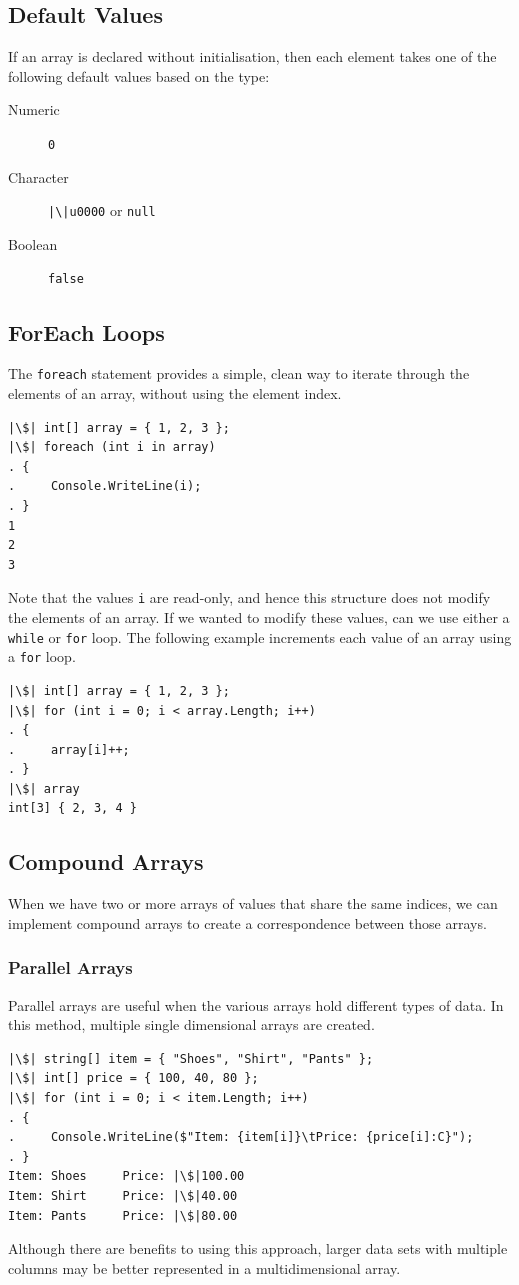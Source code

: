 \documentclass{article}
\begin{document}
\subsection{Default Values}
If an array is declared without initialisation, then each element takes
one of the following default values based on the type:
\begin{description}
    \item[Numeric] \texttt{0}
    \item[Character]
          \texttt{|\textbackslash|u0000}
          or \texttt{null}
    \item[Boolean] \texttt{false}
\end{description}
\subsection{ForEach Loops}
The \texttt{foreach} statement provides a simple, clean way
to iterate through the elements of an array, without using the element
index.
\begin{verbatim}
|\$| int[] array = { 1, 2, 3 };
|\$| foreach (int i in array)
. {
.     Console.WriteLine(i);
. }
1
2
3
\end{verbatim}
Note that the values \texttt{i} are read-only, and hence
this structure does not modify the elements of an array. If we wanted
to modify these values, can we use either a \texttt{while}
or \texttt{for} loop. The following example increments each
value of an array using a \texttt{for} loop.
\begin{verbatim}
|\$| int[] array = { 1, 2, 3 };
|\$| for (int i = 0; i < array.Length; i++)
. {
.     array[i]++;
. }
|\$| array
int[3] { 2, 3, 4 }
\end{verbatim}
\subsection{Compound Arrays}
When we have two or more arrays of values that share the same indices,
we can implement compound arrays to create a correspondence between
those arrays.
\subsubsection{Parallel Arrays}
Parallel arrays are useful when the various arrays hold different types
of data. In this method, multiple single dimensional arrays are
created.
\begin{verbatim}
|\$| string[] item = { "Shoes", "Shirt", "Pants" };
|\$| int[] price = { 100, 40, 80 };
|\$| for (int i = 0; i < item.Length; i++)
. {
.     Console.WriteLine($"Item: {item[i]}\tPrice: {price[i]:C}");
. }
Item: Shoes     Price: |\$|100.00
Item: Shirt     Price: |\$|40.00
Item: Pants     Price: |\$|80.00
\end{verbatim}
Although there are benefits to using this approach, larger data sets
with multiple columns may be better represented in a multidimensional
array.
\end{document}
